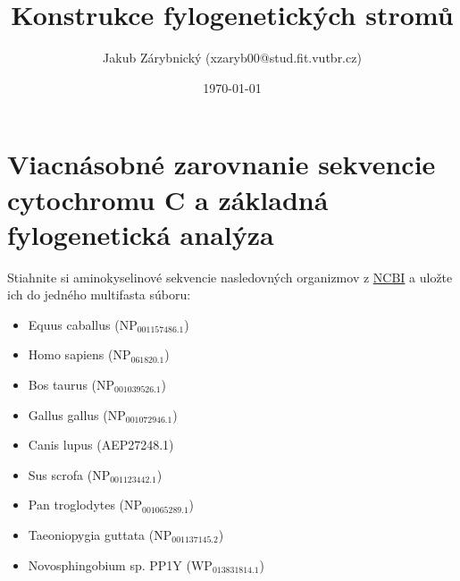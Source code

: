 \documentclass[11pt]{article}
\author{Jakub Zárybnický (xzaryb00@stud.fit.vutbr.cz)}
\date{\today}
\title{Konstrukce fylogenetických stromů}
\begin{document}
\maketitle

\section{Viacnásobné zarovnanie sekvencie cytochromu C a základná fylogenetická analýza}
\label{sec:orga80918d}
Stiahnite si aminokyselinové sekvencie nasledovných organizmov z \href{http://www.ncbi.nlm.nih.gov/protein/}{NCBI} a
uložte ich do jedného multifasta súboru:

\begin{itemize}
\item Equus caballus (NP\(_{\text{001157486.1}}\))
\item Homo sapiens (NP\(_{\text{061820.1}}\))
\item Bos taurus (NP\(_{\text{001039526.1}}\))
\item Gallus gallus (NP\(_{\text{001072946.1}}\))
\item Canis lupus (AEP27248.1)
\item Sus scrofa (NP\(_{\text{001123442.1}}\))
\item Pan troglodytes (NP\(_{\text{001065289.1}}\))
\item Taeoniopygia guttata (NP\(_{\text{001137145.2}}\))
\item Novosphingobium sp. PP1Y (WP\(_{\text{013831814.1}}\))
\end{itemize}
\end{document}
